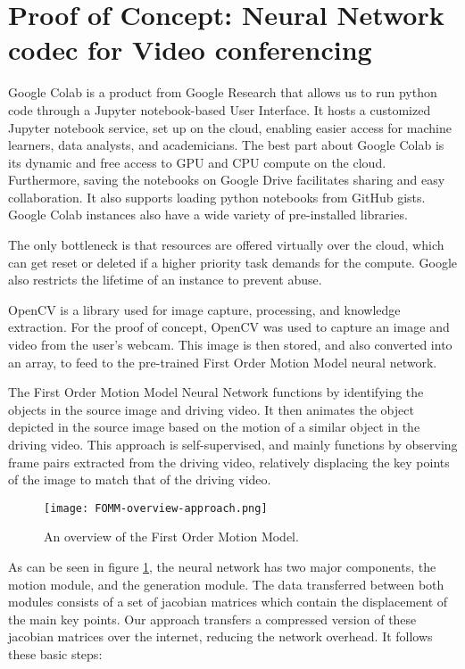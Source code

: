 \section{Proof of Concept: Neural Network codec for Video conferencing}

Google Colab is a product from Google Research that allows us to run python code through a Jupyter notebook-based User Interface. 
It hosts a customized Jupyter notebook service, set up on the cloud, enabling easier access for machine learners, data analysts, and academicians. The best part about Google Colab is its dynamic and free access to GPU and CPU compute on the cloud. Furthermore, saving the notebooks on Google Drive facilitates sharing and easy collaboration. It also supports loading python notebooks from GitHub gists. 
Google Colab instances also have a wide variety of pre-installed libraries.

The only bottleneck is that resources are offered virtually over the cloud, which can get reset or deleted if a higher priority task demands for the compute. Google also restricts the lifetime of an instance to prevent abuse.

OpenCV is a library used for image capture, processing, and knowledge extraction. For the proof of concept, OpenCV was used to capture an image and video from the user's webcam. This image is then stored, and also converted into an array, to feed to the pre-trained First Order Motion Model 
neural network.

The First Order Motion Model Neural Network functions by identifying the objects in the source image and driving video. It then animates the object depicted in the source image based on the motion of a similar object in the driving video. This approach is self-supervised, and mainly functions by 
observing frame pairs extracted from the driving video, relatively displacing the key points of the image to match that of the driving video.

\begin{figure}[h]
    \begin{center}
        \texttt{[image: FOMM-overview-approach.png]}
    \end{center}
    \caption{An overview of the First Order Motion Model.}
    \label{fig:FOMMoverview}
\end{figure}

As can be seen in figure \ref{fig:FOMMoverview}, the neural network has two major components, the motion module, and the generation module. 
The data transferred between both modules consists of a set of jacobian matrices which contain the displacement of the main key points. 
Our approach transfers a compressed version of these jacobian matrices over the internet, reducing the network overhead. It follows these basic steps: 

